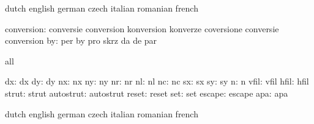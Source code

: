 \stopconstants





\startvariables            dutch                     english
                           german                    czech
                           italian                   romanian
                           french

               conversion: conversie                 conversion
                           konversion                konverze
                           coversione                conversie
                           conversion
                       by: per                       by
                           pro                       skrz
                           da                        de
                           par

\stopvariables




\startconstants            all

                       dx: dx
                       dy: dy
                       nx: nx
                       ny: ny
                       nr: nr
                       nl: nl
                       nc: nc
                       sx: sx
                       sy: sy
                        n: n
                     vfil: vfil
                     hfil: hfil
                    strut: strut
                autostrut: autostrut
                    reset: reset
                      set: set
                   escape: escape
                      apa: apa

\stopconstants




\startvariables            dutch                     english
                           german                    czech
                           italian                   romanian
                           french

